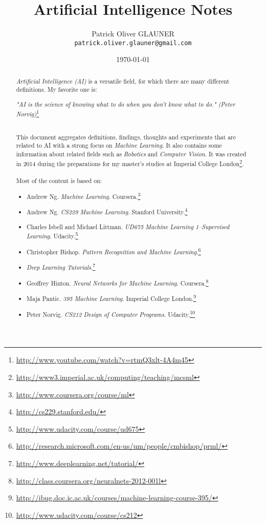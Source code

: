 \documentclass{report}
\title{Artificial Intelligence Notes}
\author{Patrick Oliver GLAUNER \\
	\texttt{patrick.oliver.glauner@gmail.com}}
\date{\today}
\begin{document}
\maketitle

\tableofcontents

\begin{abstract}
{\em Artificial Intelligence (AI)} is a versatile field, for which there are many different definitions. My favorite one is:
\begin{flushright}
{\em "AI is the science of knowing what to do when you don't know what to do." (Peter Norvig)}\footnote{\url{http://www.youtube.com/watch?v=rtmQ3xlt-4A4m45}}
\end{flushright}
~\\
This document aggregates definitions, findings, thoughts and experiments that are related to AI with a strong focus on {\em Machine Learning}. It also contains some information about related fields such as {\em Robotics} and {\em Computer Vision}.
It was created in 2014 during the preparations for my master's studies at Imperial College London\footnote{\url{http://www3.imperial.ac.uk/computing/teaching/mcsml}}.
~\\~\\
Most of the content is based on:
\begin{itemize}
\item Andrew Ng. {\em Machine Learning}. Coursera.\footnote{\url{http://www.coursera.org/course/ml}}
\item Andrew Ng. {\em CS229 Machine Learning}. Stanford University.\footnote{\url{http://cs229.stanford.edu/}}
\item Charles Isbell and Michael Littman. {\em UD675 Machine Learning 1--Supervised Learning}. Udacity.\footnote{\url{http://www.udacity.com/course/ud675}}
\item Christopher Bishop. {\em Pattern Recognition and Machine Learning}.\footnote{\url{http://research.microsoft.com/en-us/um/people/cmbishop/prml/}}
\item {\em Deep Learning Tutorials}.\footnote{\url{http://www.deeplearning.net/tutorial/}}
\item Geoffrey Hinton. {\em Neural Networks for Machine Learning}. Coursera.\footnote{\url{http://class.coursera.org/neuralnets-2012-001l}}
\item Maja Pantic. {\em 395 Machine Learning}. Imperial College London.\footnote{\url{http://ibug.doc.ic.ac.uk/courses/machine-learning-course-395/}}
\item Peter Norvig. {\em CS212 Design of Computer Programs}. Udacity.\footnote{\url{http://www.udacity.com/course/cs212}}

\end{itemize}
\end{abstract}
\end{document}
